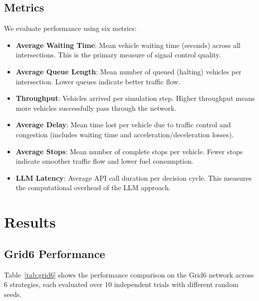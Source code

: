 \documentclass[conference]{IEEEtran}
\begin{document}
\subsection{Metrics}
We evaluate performance using six metrics:
\begin{itemize}[nosep]
    \item \textbf{Average Waiting Time}: Mean vehicle waiting time (seconds) across all intersections. This is the primary measure of signal control quality.
    \item \textbf{Average Queue Length}: Mean number of queued (halting) vehicles per intersection. Lower queues indicate better traffic flow.
    \item \textbf{Throughput}: Vehicles arrived per simulation step. Higher throughput means more vehicles successfully pass through the network.
    \item \textbf{Average Delay}: Mean time lost per vehicle due to traffic control and congestion (includes waiting time and acceleration/deceleration losses).
    \item \textbf{Average Stops}: Mean number of complete stops per vehicle. Fewer stops indicate smoother traffic flow and lower fuel consumption.
    \item \textbf{LLM Latency}: Average API call duration per decision cycle. This measures the computational overhead of the LLM approach.
\end{itemize}


\section{Results}
\label{sec:results}

\subsection{Grid6 Performance}

Table~\ref{tab:grid6} shows the performance comparison on the Grid6 network across 6 strategies, each evaluated over 10 independent trials with different random seeds.
\end{document}
